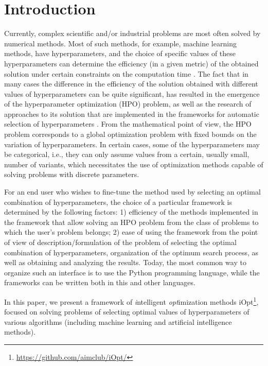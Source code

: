 \documentclass[iicol]{sn-jnl}
\theoremstyle{thmstyleone}%
\theoremstyle{thmstyletwo}%
\theoremstyle{thmstylethree}%
\begin{document}
\section{Introduction}\label{sec_intro}

Currently, complex scientific and/or industrial problems are most often solved by numerical methods. Most of such methods, for example, machine learning methods, have hyperparameters, and the choice of specific values of these hyperparameters can determine the efficiency (in a given metric) of the obtained solution under certain constraints on the computation time \citep{Hutter2019,nikitin2021}. The fact that in many cases the difference in the efficiency of the solution obtained with different values of hyperparameters can be quite significant, has resulted in the emergence of the hyperparameter optimization (HPO) problem, as well as the research of approaches to its solution that are implemented in the frameworks for automatic selection of hyperparameters \citep{Tune,optuna,hyperopt,Sherpa}. From the mathematical point of view, the HPO problem corresponds to a global optimization problem with fixed bounds on the variation of hyperparameters.  In certain cases, some of the hyperparameters may be categorical, i.e., they can only assume values from a certain, usually small, number of variants, which necessitates the use of optimization methods capable of solving problems with discrete parameters.

For an end user who wishes to fine-tune the method used by selecting an optimal combination of hyperparameters, the choice of a particular framework is determined by the following factors: 1) efficiency of the methods implemented in the framework that allow solving an HPO problem from the class of problems to which the user's problem belongs; 2) ease of using the  framework from the point of view of description/formulation of the problem of selecting the optimal combination of hyperparameters, organization of the optimum search process, as well as obtaining and analyzing the results. Today, the most common way to organize such an interface is to use the Python programming language, while the frameworks can be written both in this and other languages.

In this paper, we present a framework of \textit{i}ntelligent \textit{opt}imization methods  \textcolor[rgb]{1,0,0}{iOpt\footnote{\url{https://github.com/aimclub/iOpt/}}}, focused on solving problems of selecting optimal values of hyperparameters of various algorithms (including machine learning \textcolor[rgb]{1,0,0}{and artificial intelligence} methods). 
\end{document}
